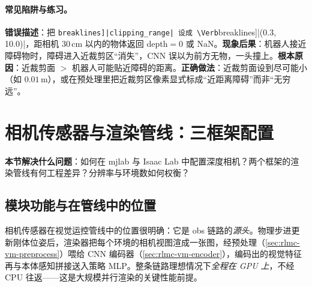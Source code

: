 \paragraph{常见陷阱与练习。}

\begin{pitfall}
\textbf{错误描述}：把 \Verb[breaklines]|clipping_range| 设成 \Verb[breaklines]|(0.3, 10.0)|，距相机 30\,cm 以内的物体返回 depth$=0$ 或 NaN。\textbf{现象后果}：机器人接近障碍物时，障碍进入近裁剪区“消失”，CNN 误以为前方无物，一头撞上。\textbf{根本原因}：近裁剪面 $>$ 机器人可能贴近障碍的距离。\textbf{正确做法}：近裁剪面设到尽可能小（如 $0.01$\,m），或在预处理里把近裁剪区像素显式标成“近距离障碍”而非“无穷远”。
\end{pitfall}

\begin{practice}[范式落差的换算]
\end{practice}

\section{相机传感器与渲染管线：三框架配置}
\label{sec:rlmc-vm-camera}

\textbf{本节解决什么问题}：如何在 mjlab 与 Isaac Lab 中配置深度相机？两个框架的渲染管线有何工程差异？分辨率与环境数如何权衡？

\subsection{模块功能与在管线中的位置}
\label{sec:rlmc-vm-camera-role}

相机传感器在视觉运控管线中的位置很明确：它是 obs 链路的\emph{源头}。物理步进更新刚体位姿后，渲染器把每个环境的相机视图渲成一张图，经预处理（\cref{sec:rlmc-vm-preprocess}）喂给 CNN 编码器（\cref{sec:rlmc-vm-encoder}），编码出的视觉特征再与本体感知拼接送入策略 MLP。整条链路理想情况下\emph{全程在 GPU 上}，不经 CPU 往返——这是大规模并行渲染的关键性能前提。

